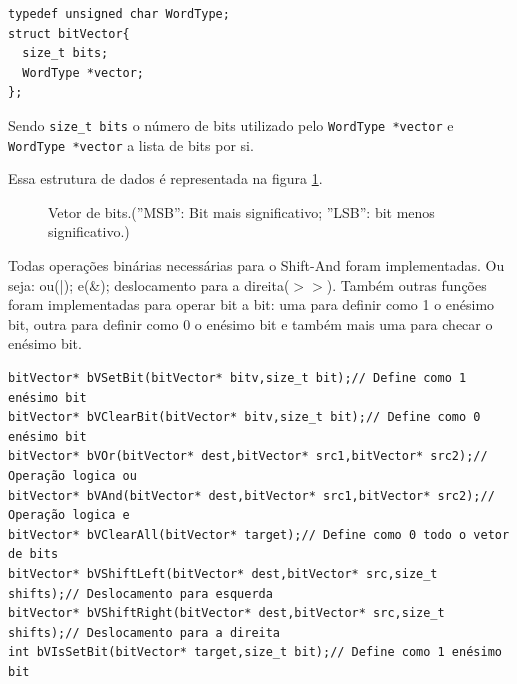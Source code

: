 \documentclass[11pt]{article}
\begin{document}
\begin{verbatim}
typedef unsigned char WordType;
struct bitVector{
  size_t bits;
  WordType *vector;
};
\end{verbatim}

Sendo \texttt{size\_t bits} o número de bits utilizado pelo \texttt{WordType *vector} e \texttt{WordType *vector} a lista de bits por si.

Essa estrutura de dados é representada na figura \ref{fig:bitv}.

\begin{figure}
\begin{center}
\end{center}
\caption{Vetor de bits.(''MSB'': Bit mais significativo; ''LSB'': bit menos significativo.)}\label{fig:bitv}
\end{figure}

Todas operações binárias necessárias para o Shift-And foram implementadas. Ou seja: ou(|); e(\&); deslocamento para a direita(\(>>\)). Também outras funções foram implementadas para operar bit a bit: uma para definir como 1 o enésimo bit, outra para definir como 0 o enésimo bit e também mais uma para checar o enésimo bit.

\begin{verbatim}
bitVector* bVSetBit(bitVector* bitv,size_t bit);// Define como 1 enésimo bit
bitVector* bVClearBit(bitVector* bitv,size_t bit);// Define como 0 enésimo bit
bitVector* bVOr(bitVector* dest,bitVector* src1,bitVector* src2);// Operação logica ou
bitVector* bVAnd(bitVector* dest,bitVector* src1,bitVector* src2);// Operação logica e
bitVector* bVClearAll(bitVector* target);// Define como 0 todo o vetor de bits
bitVector* bVShiftLeft(bitVector* dest,bitVector* src,size_t shifts);// Deslocamento para esquerda
bitVector* bVShiftRight(bitVector* dest,bitVector* src,size_t shifts);// Deslocamento para a direita
int bVIsSetBit(bitVector* target,size_t bit);// Define como 1 enésimo bit
\end{verbatim}
\end{document}
